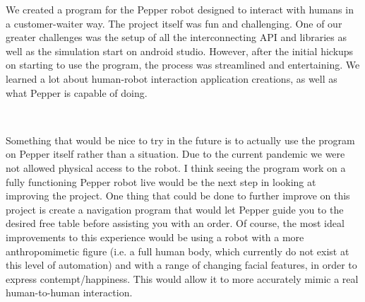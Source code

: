 \documentclass[12pt, letterpaper, twoside]{article}
\begin{document}
We created a program for the Pepper robot designed to interact with humans in a customer-waiter way. The project itself was fun and challenging. One of our greater challenges was the setup of all the interconnecting API and libraries as well as the simulation start on android studio. However, after the initial hickups on starting to use the program, the process was streamlined and entertaining. We learned a lot about human-robot interaction application creations, as well as what Pepper is capable of doing. 

\

Something that would be nice to try in the future is to actually use the program on Pepper itself rather than a situation. Due to the current pandemic we were not allowed physical access to the robot. I think seeing the program work on a fully functioning Pepper robot live would be the next step in looking at improving the project. One thing that could be done to further improve on this project is create a navigation program that would let Pepper guide you to the desired free table before assisting you with an order. Of course, the most ideal improvements to this experience would be using a robot with a more anthropomimetic figure (i.e. a full human body, which currently do not exist at this level of automation) and with a range of changing facial features, in order to express contempt/happiness. This would allow it to more accurately mimic a real human-to-human interaction.  

\




\newpage

\nocite{*}
\printbibliography[heading=bibintoc,title={References}]
\end{document}
